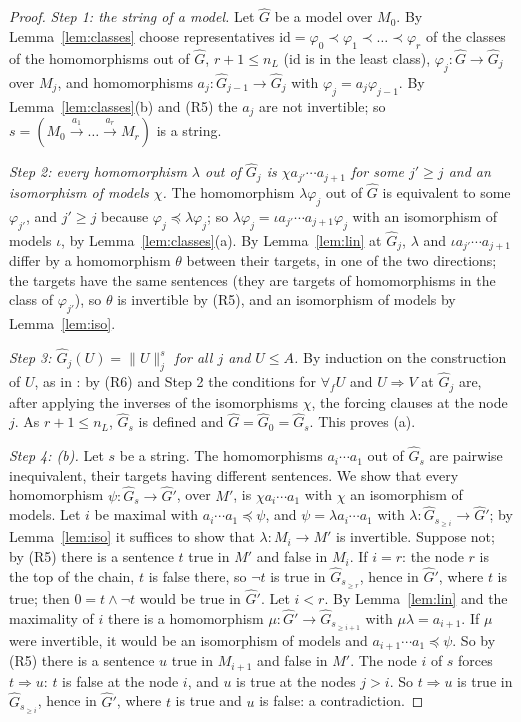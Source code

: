 \documentclass[11pt]{amsart}
\theoremstyle{definition}
\newcommand{\id}{\mathrm{id}}
\begin{document}
\begin{proof}
\emph{Step 1: the string of a model.} Let $\hat G$ be a model over
$M_0$. By Lemma~\ref{lem:classes} choose representatives $\id=
\varphi_0\prec\varphi_1\prec\dots\prec\varphi_r$ of the classes of the
homomorphisms out of $\hat G$, $r+1\le n_L$ ($\id$ is in the least
class), $\varphi_j\colon\hat G\to\hat G_j$ over $M_j$, and
homomorphisms $a_j\colon\hat G_{j-1}\to\hat G_j$ with
$\varphi_j=a_j\varphi_{j-1}$. By Lemma~\ref{lem:classes}(b) and (R5)
the $a_j$ are not invertible; so $s=(M_0\xrightarrow{a_1}\dots
\xrightarrow{a_r}M_r)$ is a string.

\emph{Step 2: every homomorphism $\lambda$ out of $\hat G_j$ is $\chi
a_{j'}\cdots a_{j+1}$ for some $j'\ge j$ and an isomorphism of models
$\chi$.} The homomorphism $\lambda\varphi_j$ out of $\hat G$ is
equivalent to some $\varphi_{j'}$, and $j'\ge j$ because
$\varphi_j\preceq\lambda\varphi_j$; so $\lambda\varphi_j=\iota
a_{j'}\cdots a_{j+1}\varphi_j$ with an isomorphism of models $\iota$,
by Lemma~\ref{lem:classes}(a). By Lemma~\ref{lem:lin} at $\hat G_j$,
$\lambda$ and $\iota a_{j'}\cdots a_{j+1}$ differ by a homomorphism
$\theta$ between their targets, in one of the two directions; the
targets have the same sentences (they are targets of homomorphisms in
the class of $\varphi_{j'}$), so $\theta$ is invertible by (R5), and
an isomorphism of models by Lemma~\ref{lem:iso}.

\emph{Step 3: $\hat G_j(U)=\|U\|^s_j$ for all $j$ and $U\le A$.} By
induction on the construction of $U$, as in
\cite[Prop.~4.2, Step~3]{Strings}: by (R6) and Step 2 the conditions
for $\forall_fU$ and $U\Rightarrow V$ at $\hat G_j$ are, after applying
the inverses of the isomorphisms $\chi$, the forcing clauses at the
node $j$. As $r+1\le n_L$, $\hat G_s$ is defined and $\hat G=\hat
G_0=\hat G_s$. This proves (a).

\emph{Step 4: \emph{(b)}.} Let $s$ be a string. The homomorphisms
$a_i\cdots a_1$ out of $\hat G_s$ are pairwise inequivalent, their
targets having different sentences. We show that every homomorphism
$\psi\colon\hat G_s\to\hat G'$, over $M'$, is $\chi a_i\cdots a_1$
with $\chi$ an isomorphism of models. Let $i$ be maximal with
$a_i\cdots a_1\preceq\psi$, and $\psi=\lambda a_i\cdots a_1$ with
$\lambda\colon\hat G_{s_{\ge i}}\to\hat G'$; by Lemma~\ref{lem:iso}
it suffices to show that $\lambda\colon M_i\to M'$ is invertible.
Suppose not; by (R5) there is a sentence $t$ true in $M'$ and false in
$M_i$. If $i=r$: the node $r$ is the top of the chain, $t$ is false
there, so $\neg t$ is true in $\hat G_{s_{\ge r}}$, hence in $\hat
G'$, where $t$ is true; then $0=t\wedge\neg t$ would be true in $\hat
G'$. Let $i<r$. By Lemma~\ref{lem:lin} and the maximality of $i$ there
is a homomorphism $\mu\colon\hat G'\to\hat G_{s_{\ge i+1}}$ with
$\mu\lambda=a_{i+1}$. If $\mu$ were invertible, it would be an
isomorphism of models and $a_{i+1}\cdots a_1\preceq\psi$. So by (R5)
there is a sentence $u$ true in $M_{i+1}$ and false in $M'$. The node
$i$ of $s$ forces $t\Rightarrow u$: $t$ is false at the node $i$, and
$u$ is true at the nodes $j>i$. So $t\Rightarrow u$ is true in $\hat
G_{s_{\ge i}}$, hence in $\hat G'$, where $t$ is true and $u$ is
false: a contradiction.


\end{proof}
\end{document}
